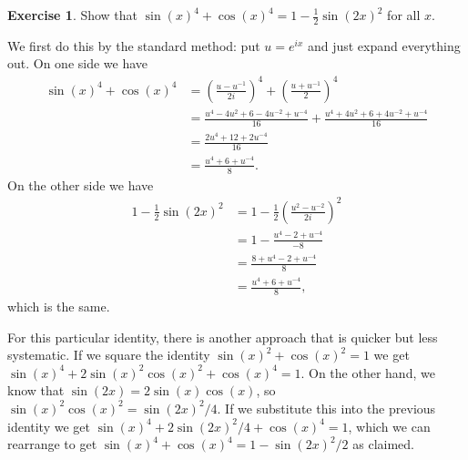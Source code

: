 \documentclass[a4paper]{amsart}
\theoremstyle{definition}
\newtheorem{exercise}{Exercise}[section]
\newenvironment{solution}{{\noindent \bf Solution:}}{}
\begin{document}
\begin{exercise}\label{ex-trig-misc-i}
 Show that $\sin(x)^4+\cos(x)^4=1-\frac{1}{2}\sin(2x)^2$ for all $x$.
\end{exercise}
\begin{solution}
 We first do this by the standard method: put $u=e^{ix}$ and just
 expand everything out.  On one side we have
 \begin{align*}
  \sin(x)^4+\cos(x)^4 &= 
   \left(\frac{u-u^{-1}}{2i}\right)^4 + 
   \left(\frac{u+u^{-1}}{2}\right)^4  \\
  &= \frac{u^4-4u^2+6-4u^{-2}+u^{-4}}{16} + 
     \frac{u^4+4u^2+6+4u^{-2}+u^{-4}}{16} \\
  &= \frac{2u^4+12+2u^{-4}}{16} \\
  &= \frac{u^4+6+u^{-4}}{8}. 
 \end{align*}
 On the other side we have
 \begin{align*}
  1-\frac{1}{2}\sin(2x)^2 
   &= 1 - \frac{1}{2}\left(\frac{u^2-u^{-2}}{2i}\right)^2 \\
   &= 1 - \frac{u^4-2+u^{-4}}{-8} \\
   &= \frac{8 + u^4 - 2 + u^{-4}}{8} \\
   &= \frac{u^4+6+u^{-4}}{8},
 \end{align*}
 which is the same.

 For this particular identity, there is another approach that is
 quicker but less systematic.  If we square the identity
 $\sin(x)^2+\cos(x)^2=1$ we get
 $\sin(x)^4+2\sin(x)^2\cos(x)^2+\cos(x)^4=1$.  On the other hand, we
 know that $\sin(2x)=2\sin(x)\cos(x)$, so
 $\sin(x)^2\cos(x)^2=\sin(2x)^2/4$.  If we substitute this into the
 previous identity we get $\sin(x)^4+2\sin(2x)^2/4+\cos(x)^4=1$, which
 we can rearrange to get $\sin(x)^4+\cos(x)^4=1-\sin(2x)^2/2$ as
 claimed. 
\end{solution}
\end{document}
